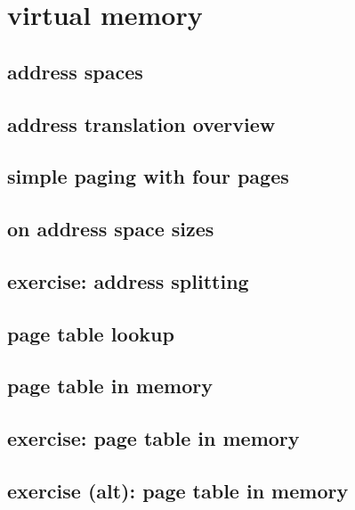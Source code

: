 

\section{virtual memory}

\subsection{address spaces}



\subsection{address translation overview}


\subsection{simple paging with four pages}


\subsection{on address space sizes}


\subsection{exercise: address splitting}


\subsection{page table lookup}
 

\subsection{page table in memory}



\subsection{exercise: page table in memory}

\subsection{exercise (alt): page table in memory}


